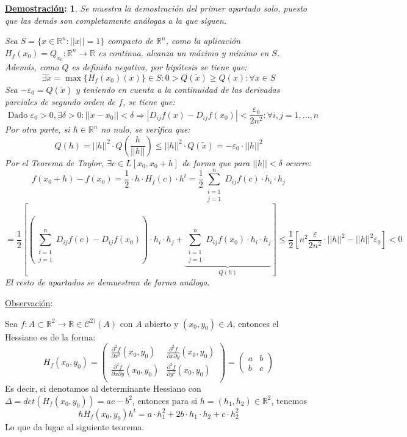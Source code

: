 \documentclass[10pt,a4paper,openright]{book}
\theoremstyle{break}
\newtheorem*{demo}{\underline{Demostración}:}
\begin{document}
\begin{demo}
Se muestra la demostración del primer apartado solo, puesto que las demás son completamente análogas a la que siguen.

Sea $S = \{x \in \mathbb{R}^n : || x || = 1\}$ compacto de $\mathbb{R}^n$, como la aplicación $H_f (x_0) = Q_{x_0} : \mathbb{R}^n \to \mathbb{R}$ es continua, alcanza un máximo y mínimo en $S$. Además, como $Q$ es definida negativa, por hipótesis se tiene que:
$$\exists \tilde{x}=\max\{H_f(x_0)(x)\} \in S : 0 > Q(\tilde{x}) \geq Q(x) : \forall x \in S$$
Sea $-\varepsilon_0 = Q(\tilde{x})$ y teniendo en cuenta a la continuidad de las derivadas parciales de segundo orden de $f$, se tiene que: 
$$\mbox{ Dado } \varepsilon_0 > 0, \exists \delta > 0 : || x - x_0 || < \delta \Rightarrow \left| D_{ij} f(x) - D_{ij} f(x_0) \right| < \frac{\varepsilon_0}{2n^2} : \forall i,j = 1, \ldots, n$$
Por otra parte, si $h \in \mathbb{R}^n$ no nulo, se verifica que:
$$Q(h)= || h||^2 \cdot Q\left(\frac{h}{||h||}\right) \leq ||h||^2 \cdot  Q(\tilde{x}) = -\varepsilon_0 \cdot ||h||^2$$
Por el Teorema de Taylor, $\exists c \in L[x_0, x_0 + h]$ de forma que para $||h|| < \delta$ ocurre:
$$f(x_0 + h) - f(x_0) = \frac{1}{2} \cdot h \cdot H_f(c) \cdot h^t = \frac{1}{2} \sum_{\substack{i = 1 \\ j = 1}}^{n} D_{ij} f(c) \cdot h_i \cdot h_j $$
$$= \frac{1}{2} \left[ \left(\sum_{\substack{i = 1 \\ j = 1}}^{n} D_{ij} f(c) - D_{ij} f(x_0)  \right) \cdot h_i \cdot h_j + \underbrace{\sum_{\substack{i = 1 \\ j = 1}}^{n} D_{ij} f(x_0) \cdot h_i \cdot h_j}_{Q(h)} \right] \leq \frac{1}{2} \left[ n^2 \frac{\varepsilon}{2n^2} \cdot ||h||^2 - ||h||^2 \varepsilon_0 \right] < 0$$
El resto de apartados se demuestran de forma análoga.
\end{demo}

\underline{Observación}:

Sea $f : A \subset \mathbb{R}^2 \to \mathbb{R}\in \mathcal{C}^{2)}(A)$ con $A$ abierto y $(x_0, y_0) \in A$, entonces el Hessiano es de la forma:
$$H_f (x_0, y_0) = \begin{pmatrix} \frac{\partial^2 f}{\partial x^2} (x_0, y_0) & \frac{\partial^2 f}{\partial x \partial y} (x_0, y_0) \\ \frac{\partial^2 f}{\partial x \partial y} (x_0, y_0) & \frac{\partial^2 f}{\partial y^2} (x_0, y_0) \\ \end{pmatrix} = \begin{pmatrix} a & b \\ b & c \end{pmatrix}$$
Es decir, si denotamos al determinante Hessiano con $\Delta = det(H_f (x_0, y_0)) = ac - b^2$, entonces para si $h = (h_1, h_2) \in \mathbb{R}^2$, tenemos
$$h H_f (x_0, y_0) h^t = a \cdot h_1^2 + 2 b \cdot h_1 \cdot h_2 + c \cdot h_2^2$$
Lo que da lugar al siguiente teorema.
\end{document}
